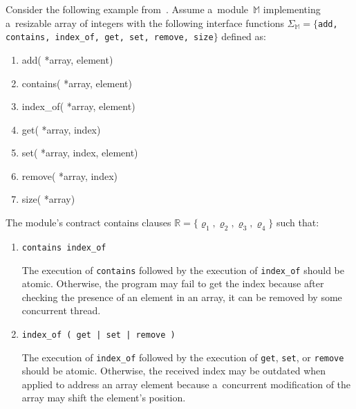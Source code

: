 \begin{example}
    \label{ex:contractsBasic}
    Consider the following example from~\cite{contracts2017, contracts2015}. Assume a~module~$ \mathbb{M} $ implementing a~resizable array of integers with the following interface functions $ \Sigma_\mathbb{M} = \{ $\texttt{add, contains, index\_of, get, set, remove, size}$ \} $ defined as:
    \begin{enumerate}[label=]
        \tt

        \item {} add( *array,  element)

        \item {} contains( *array,  element)

        \item {} index\_of( *array,  element)

        \item {} get( *array,  index)

        \item {} set( *array,  index,  element)

        \item {} remove( *array,  index)

        \item {} size( *array)
    \end{enumerate}
    The module's contract contains clauses $ \mathbb{R} = \{\varrho_1, \varrho_2, \varrho_3, \varrho_4\} $ such that:
    \begin{enumerate}[label={($ \varrho_{\arabic*} $)}]
        \item \texttt{contains index\_of}
            \begin{addmargin}[1em]{0em}
                The execution of \texttt{contains} followed by the execution of \texttt{index\_of} should be atomic. Otherwise, the program may fail to get the index because after checking the presence of an element in an array, it can be removed by some concurrent thread.
            \end{addmargin}

        \item \texttt{index\_of (\,get\,|\,set\,|\,remove\,)}
            \begin{addmargin}[1em]{0em}
                The execution of \texttt{index\_of} followed by the execution of \texttt{get}, \texttt{set}, or \texttt{remove} should be atomic. Otherwise, the received index may be outdated when applied to address an array element because a~concurrent modification of the array may shift the element's position.
            \end{addmargin}


\end{enumerate}
\end{example}
